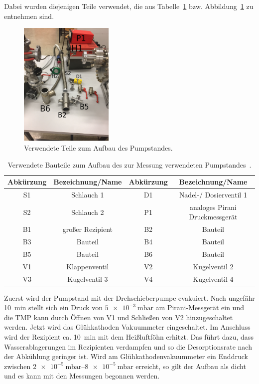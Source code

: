 Dabei wurden diejenigen Teile verwendet,
die aus Tabelle~\ref{tab:Teile} bzw. Abbildung~\ref{fig:Teile} zu entnehmen sind.

\begin{figure}
  \centering
  \includegraphics[width=0.4\textwidth]{IMG_6891.JPG}
  \caption{Verwendete Teile zum Aufbau des Pumpstandes.}
  \label{fig:Teile}
\end{figure}

\begin{table}
  \caption{Verwendete Bauteile zum Aufbau des zur Messung verwendeten Pumpstandes~\cite{anleitung}.}
  \label{tab:Teile}
  \begin{tabular}{c c | c c}
    \toprule
    Abkürzung & Bezeichnung/Name & Abkürzung & Bezeichnung/Name \\
    \midrule
    S1 & Schlauch 1 & D1 & Nadel-/ Dosierventil 1 \\
    S2 & Schlauch 2 & P1 & analoges Pirani Druckmessgerät \\
    B1 & großer Rezipient & B2 & Bauteil \\
    B3 & Bauteil & B4 & Bauteil \\
    B5 & Bauteil & B6 & Bauteil \\
    V1 & Klappenventil & V2 & Kugelventil 2 \\
    V3 & Kugelventil 3 & V4 & Kugelventil 4 \\
  \end{tabular}
\end{table}

Zuerst wird der Pumpstand mit der Drehschieberpumpe evakuiert.
Nach ungefähr \SI{10}{\minute}
stellt sich ein Druck von $\SI{5e-3}{\milli\bar}$ am Pirani-Messgerät ein und die TMP
kann durch Öffnen von V1 und Schließen von V2 hinzugeschaltet werden.
Jetzt wird das Glühkathoden Vakuummeter eingeschaltet.
Im Anschluss wird der Rezipient ca. \SI{10}{\minute} mit dem Heißluftföhn erhitzt.
Das führt dazu, dass Wasserablagerungen im Rezipienten verdampfen
und so die Desorptionsrate nach der Abkühlung geringer ist.
Wird am Glühkathodenvakuummeter ein Enddruck zwischen $\SIrange{2e-5}{8e-5}{\milli\bar}$ erreicht,
so gilt der Aufbau als dicht und es kann mit den Messungen begonnen werden.


